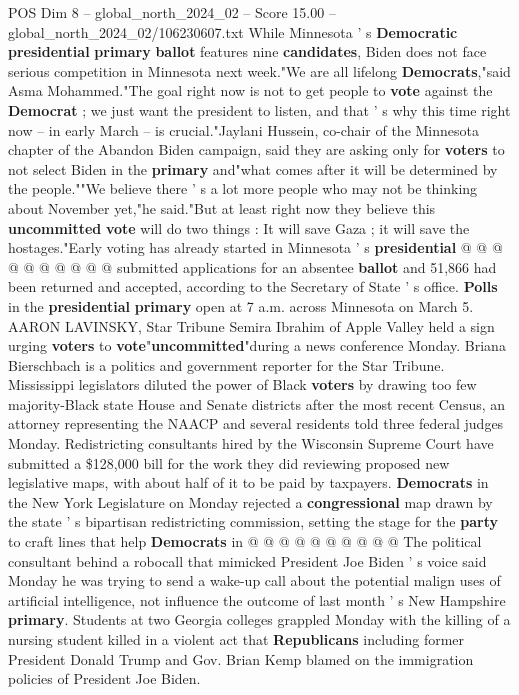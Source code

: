 \begin{textsample}{POS Dim 8 – global\_north\_2024\_02 – Score 15.00 – global\_north\_2024\_02/106230607.txt}
While Minnesota ' s \textbf{Democratic} \textbf{presidential} \textbf{primary} \textbf{ballot} features nine \textbf{candidates}, Biden does not face serious competition in Minnesota next week."We are all lifelong \textbf{Democrats},"said Asma Mohammed."The goal right now is not to get people to \textbf{vote} against the \textbf{Democrat} ; we just want the president to listen, and that ' s why this time right now -- in early March -- is crucial."Jaylani Hussein, co-chair of the Minnesota chapter of the Abandon Biden campaign, said they are asking only for \textbf{voters} to not select Biden in the \textbf{primary} and"what comes after it will be determined by the people.""We believe there ' s a lot more people who may not be thinking about November yet,"he said."But at least right now they believe this \textbf{uncommitted} \textbf{vote} will do two things : It will save Gaza ; it will save the hostages."Early voting has already started in Minnesota ' s \textbf{presidential} @ @ @ @ @ @ @ @ @ @ submitted applications for an absentee \textbf{ballot} and 51,866 had been returned and accepted, according to the Secretary of State ' s office. \textbf{Polls} in the \textbf{presidential} \textbf{primary} open at 7 a.m. across Minnesota on March 5.
AARON LAVINSKY, Star Tribune Semira Ibrahim of Apple Valley held a sign urging \textbf{voters} to \textbf{vote}"\textbf{uncommitted}"during a news conference Monday.
Briana Bierschbach is a politics and government reporter for the Star Tribune.
Mississippi legislators diluted the power of Black \textbf{voters} by drawing too few majority-Black state House and Senate districts after the most recent Census, an attorney representing the NAACP and several residents told three federal judges Monday.
Redistricting consultants hired by the Wisconsin Supreme Court have submitted a \$128,000 bill for the work they did reviewing proposed new legislative maps, with about half of it to be paid by taxpayers. \textbf{Democrats} in the New York Legislature on Monday rejected a \textbf{congressional} map drawn by the state ' s bipartisan redistricting commission, setting the stage for the \textbf{party} to craft lines that help \textbf{Democrats} in @ @ @ @ @ @ @ @ @ @ The political consultant behind a robocall that mimicked President Joe Biden ' s voice said Monday he was trying to send a wake-up call about the potential malign uses of artificial intelligence, not influence the outcome of last month ' s New Hampshire \textbf{primary}.
Students at two Georgia colleges grappled Monday with the killing of a nursing student killed in a violent act that \textbf{Republicans} including former President Donald Trump and Gov.
Brian Kemp blamed on the immigration policies of President Joe Biden.

\end{textsample}
